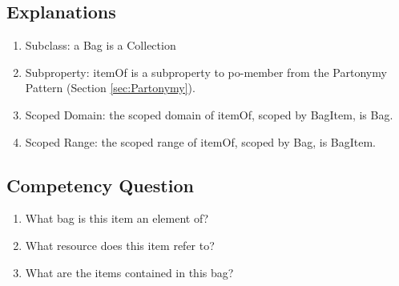 \subsection{Explanations}
\label{exp:Aggregation,}
\begin{enumerate}
\item Subclass: a \textsf{Bag} is a \textsf{Collection}
\item Subproperty: \textsf{itemOf} is a subproperty to \textsf{po-member} from the Partonymy Pattern (Section \ref{sec:Partonymy}).
\item Scoped Domain: the scoped domain of \textsf{itemOf}, scoped by \textsf{BagItem}, is \textsf{Bag}.
\item Scoped Range: the scoped range of \textsf{itemOf}, scoped by \textsf{Bag}, is \textsf{BagItem}.
\end{enumerate}

\subsection{Competency Question}
\label{cqs:Aggregation,}
\begin{enumerate}[CQ1.]
\item What bag is this item an element of?
\item What resource does this item refer to?
\item What are the items contained in this bag?
\end{enumerate}

\newpage
